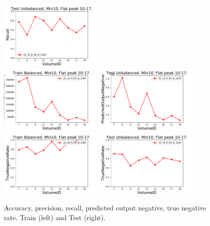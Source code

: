 \begin{figure}[t]
\includegraphics[width=0.45\textwidth]{plots/plot_03_1_overlay_graph_Recall_VolumeID_Test.pdf}\\
\includegraphics[width=0.45\textwidth]{plots/plot_03_1_overlay_graph_PredictedOutputNegative_VolumeID_Train.pdf}
\includegraphics[width=0.45\textwidth]{plots/plot_03_1_overlay_graph_PredictedOutputNegative_VolumeID_Test.pdf}\\
\includegraphics[width=0.45\textwidth]{plots/plot_03_1_overlay_graph_TrueNegativeRate_VolumeID_Train.pdf}
\includegraphics[width=0.45\textwidth]{plots/plot_03_1_overlay_graph_TrueNegativeRate_VolumeID_Test.pdf}\\
\caption{Accuracy, precision, recall, predicted output negative, true negative rate. Train (left) and Test (right). }
\label{fig:FiguresOfMerit1}
\end{figure}


